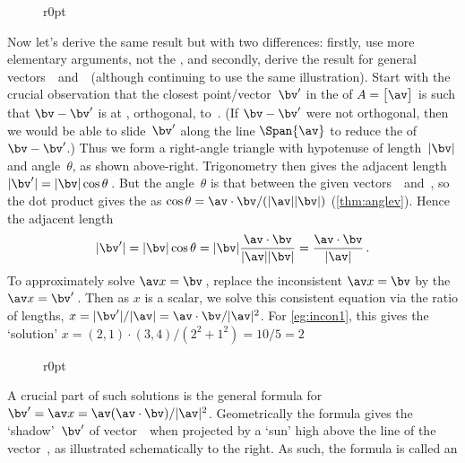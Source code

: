 \begin{wrapfigure}r{0pt}  \end{wrapfigure}
Now let's derive the same result but with two differences:
firstly, use more elementary arguments, not the \svd, 
and secondly, derive the result for general vectors~\av\ and~\bv\ (although continuing to use the same illustration).
Start with the crucial observation that the closest point\slash vector~\(\bv'\) in the  of \(A=\begin{bmatrix} \av \end{bmatrix}\) is such that \(\bv-\bv'\) is at , orthogonal, to~\av.
(If \(\bv-\bv'\) were not orthogonal, then we would be able to slide~\(\bv'\) along the line \(\Span\{\av\}\) to reduce the  of \(\bv-\bv'\).)
Thus we form a right-angle triangle with hypotenuse of length~\(|\bv|\) and angle~\(\theta\), as shown above-right.
Trigonometry then gives the adjacent length \(|\bv'|=|\bv|\cos\theta\)\,.
But the angle~\(\theta\) is that between the given vectors~\av\ and~\bv, so the dot product gives the  as \(\cos\theta={\av\cdot\bv}/({|\av||\bv|})\)  (\cref{thm:anglev}).
Hence the adjacent length \begin{equation*}
|\bv'|=|\bv|\cos\theta
=|\bv|\frac{\av\cdot\bv}{|\av||\bv|}=\frac{\av\cdot\bv}{|\av|}\,.
\end{equation*}
To approximately solve \(\av x=\bv\)\,, replace the inconsistent \(\av x=\bv\) by the  \(\av x=\bv'\)\,.
Then as \(x\) is a scalar, we solve this consistent equation via the ratio of lengths,  \(x=|\bv'|/|\av|={\av\cdot\bv}/|\av|^2\).
For \cref{eg:incon1}, this gives the `solution' \(x=(2,1)\cdot(3,4)/(2^2+1^2)=10/5=2\) 

\begin{wrapfigure}[7]r{0pt}  \end{wrapfigure}
A crucial part of such solutions is the general formula for \(\bv'=\av x=\av(\av\cdot\bv)/|\av|^2\).
Geometrically the formula gives the `shadow'~\(\bv'\) of vector~\bv\ when projected by a `sun' high above the line of the vector~\av, as illustrated schematically to the right.
As such, the formula is called an 
\vspace{2\baselineskip}

\endgroup%



